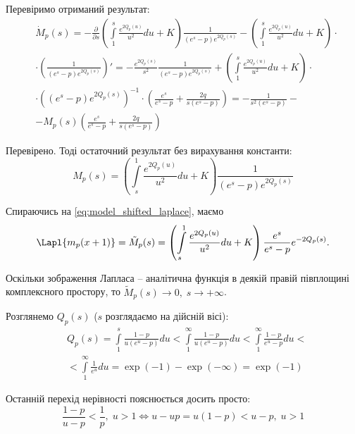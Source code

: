 Перевіримо отриманий результат:
\begin{equation*}
\begin{split}
&\dot M_{p}(s) = - \frac{\partial}{\partial s}\left( \int\limits_1^s \frac{e^{2Q_p(u)}}{u^2} du + K \right) \frac{1}{(e^s - p)  e^{2Q_p(s)}} -\left( \int\limits_1^s \frac{e^{2Q_p(u)}}{u^2} du + K \right)\cdot \\ 
&\cdot \left(\frac{1}{(e^s - p)  e^{2Q_p(s)}}\right)' = -\frac{e^{2Q_p(s)}}{s^2} \frac{1}{(e^s - p)  e^{2Q_p(s)}}  + \left( \int\limits_1^s \frac{e^{2Q_p(u)}}{u^2} du + K \right) \cdot \\
& \cdot \left((e^s - p)  e^{2Q_p(s)}\right)^{-1} \cdot \left(\frac{e^s}{e^s - p}  + \frac{2q}{s(e^s - p)}   \right)= -\frac{1}{s^2(e^s - p)} -\\
&- M_{p}(s)\left(\frac{e^s}{e^s - p}  + \frac{2q}{s(e^s - p)}   \right)
\end{split}
\end{equation*}

Перевірено. Тоді остаточний результат без вирахування константи:
\begin{equation}
\label{eq:model_laplace_sol_initial}
M_p(s)= \left( \int\limits_s^1 \frac{e^{2Q_p(u)}}{u^2} du + K \right) \frac{1}{(e^s - p)  e^{2Q_p(s)}}
\end{equation}

Спираючись на \eqref{eq:model_shifted_laplace}, маємо
\begin{equation}
\Lapl{m_p(x+1)} =\tilde M_p(s)= \left( \int\limits_s^1 \frac{e^{2Q_p(u)}}{u^2} du + K \right) \frac{e^s}{e^s - p} e^{- 2Q_p(s)}.
\end{equation}

Оскільки зображення Лапласа – аналітична функція в деякій правій півплощині комплексного простору, то $\tilde M_p(s) \rightarrow 0,\; s \rightarrow +\infty$.

Розглянемо $Q_p(s)$ ($s$ розглядаємо на дійсній вісі):
\begin{equation}
\begin{split}
\label{eq:q_p_s_major}
&Q_p(s) = \int\limits_1^s \frac{1-p}{u(e^u - p)} du <  \int\limits_1^\infty \frac{1 - p}{u(e^u - p)} du < 
\int\limits_1^\infty \frac{1- p}{e^u - p} du<\\
&< \int\limits_1^\infty \frac{1}{e^u} du = \exp(-1) - \exp(-\infty) = \exp(-1)
\end{split}
\end{equation}

Останній перехід нерівності пояснюється досить просто:
$$
\frac{1-p}{u - p} < \frac{1}{p}, \; u > 1 \Leftrightarrow u - u p = u(1-p) < u - p, \; u > 1
$$

